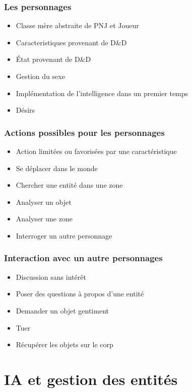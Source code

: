 \documentclass{beamer}
\begin{document}
\begin{frame}
      \frametitle{Les personnages}
    \begin{itemize}
        \item Classe mère abstraite de PNJ et Joueur
        \item Caracteristiques provenant de D\&D
        \item État provenant de D\&D
        \item Gestion du sexe
        \item Implémentation de l'intelligence dans un premier temps
        \item Désirs
    \end{itemize} 
\end{frame}

\begin{frame}
      \frametitle{Actions possibles pour les personnages}
    \begin{itemize}
        \item Action limitées ou favorisées par une caractéristique
        \item Se déplacer dans le monde
        \item Chercher une entité dans une zone
        \item Analyser un objet
        \item Analyser une zone
        \item Interroger un autre personnage
    \end{itemize} 
\end{frame}

\begin{frame}
    \frametitle{Interaction avec un autre personnages}
      \begin{itemize}
          \item Discussion sans intérêt
          \item Poser des questions à propos d'une entité
          \item Demander un objet gentiment
          \item Tuer
          \item Récupérer les objets sur le corp
      \end{itemize} 
\end{frame}

\author{GUINGOIN Sylvain}
\section{IA et gestion des entités}
\end{document}

